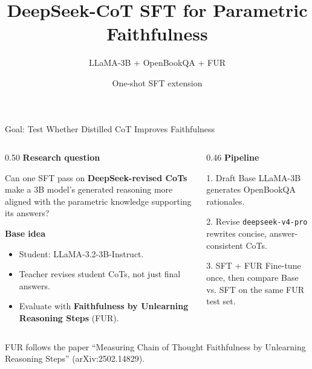 \documentclass[aspectratio=169,10pt]{beamer}
\title{DeepSeek-CoT SFT for Parametric Faithfulness}
\subtitle{LLaMA-3B + OpenBookQA + FUR}
\author{One-shot SFT extension}
\date{}
\newcommand{\good}[1]{\textcolor{mainblue}{\textbf{#1}}}
\newcommand{\smallgray}[1]{\textcolor{black!65}{\scriptsize #1}}
\begin{document}
\begin{frame}{Goal: Test Whether Distilled CoT Improves Faithfulness}
\small
\begin{columns}[T,onlytextwidth]
  \begin{column}{0.50\textwidth}
    \textbf{Research question}

    \vspace{0.35em}
    Can one SFT pass on \good{DeepSeek-revised CoTs} make a 3B model's
    generated reasoning more aligned with the parametric knowledge supporting
    its answers?

    \vspace{0.8em}
    \textbf{Base idea}
    \begin{itemize}
      \item Student: LLaMA-3.2-3B-Instruct.
      \item Teacher revises student CoTs, not just final answers.
      \item Evaluate with \good{Faithfulness by Unlearning Reasoning Steps} (FUR).
    \end{itemize}
  \end{column}

  \begin{column}{0.46\textwidth}
    \textbf{Pipeline}

    \vspace{0.35em}
    \begin{block}{1. Draft}
      Base LLaMA-3B generates OpenBookQA rationales.
    \end{block}
    \begin{block}{2. Revise}
      \texttt{deepseek-v4-pro} rewrites concise, answer-consistent CoTs.
    \end{block}
    \begin{block}{3. SFT + FUR}
      Fine-tune once, then compare Base vs. SFT on the same FUR test set.
    \end{block}
  \end{column}
\end{columns}

\vspace{0.5em}
\smallgray{FUR follows the paper ``Measuring Chain of Thought Faithfulness by Unlearning Reasoning Steps'' (arXiv:2502.14829).}
\end{frame}
\end{document}
